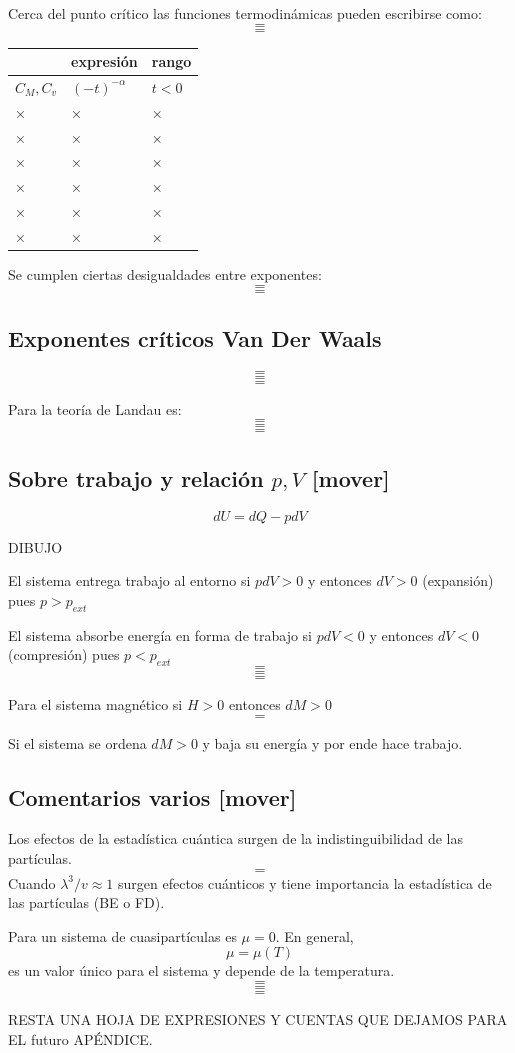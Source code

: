 \documentclass[10pt,oneside]{CBFT_book}
\begin{document}
Cerca del punto crítico las funciones termodinámicas pueden escribirse como:
\[=\]
\[=\]

\begin{center}
\begin{tabular}{lll}
 & expresión & rango \\
\hline
$C_M, C_v$ & $(-t)^{-\alpha}$ & $t < 0$  \\
× & × & ×\\
× & × & ×\\
× & × & ×\\
× & × & ×\\
× & × & ×\\
× & × & ×
\end{tabular}
\end{center}

Se cumplen ciertas desigualdades entre exponentes:
\[=\]
\[=\]

\subsection{Exponentes críticos Van Der Waals} 

\[=\]
\[=\]
\[=\]

Para la teoría de Landau es:
\[=\]
\[=\]
\[=\]

\subsection{Sobre trabajo y relación $p,V$ [mover]}

\[ 
	dU = dQ - p dV
\]

DIBUJO 

El sistema entrega trabajo al entorno si $ pdV > 0 $ y entonces $ dV > 0 $ (expansión)
pues $ p > p_{ext} $

El sistema absorbe energía en forma de trabajo si $ pdV < 0 $ y entonces $ dV < 0 $ (compresión)
pues $ p < p_{ext} $
\[=\]
\[=\]
\[=\]

Para el sistema magnético si $ H > 0 $ entonces $ dM > 0 $
\[=\]

Si el sistema se ordena $dM>0$ y baja su energía y por ende hace trabajo.

\subsection{Comentarios varios [mover]}

Los efectos de la estadística cuántica surgen de la indistinguibilidad de las partículas.
\[=\]
Cuando $\lambda^3/v \approx 1$ surgen efectos cuánticos y tiene importancia la estadística de las
partículas (BE o FD).

Para un sistema de cuasipartículas es $\mu=0$. En general,
\[
	\mu = \mu(T)
\]
es un valor único para el sistema y depende de la temperatura.
\[=\]
\[=\]
\[=\]

RESTA UNA HOJA DE EXPRESIONES Y CUENTAS QUE DEJAMOS PARA EL futuro APÉNDICE.

\end{document}
